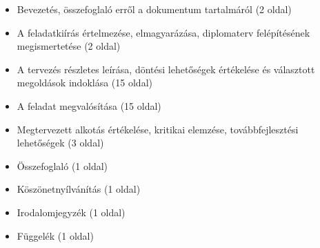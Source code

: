 \begin{itemize}
    \item Bevezetés, összefoglaló erről a dokumentum tartalmáról (2 oldal)
    \item A feladatkiírás értelmezése, elmagyarázása, diplomaterv felépítésének megismertetése (2 oldal)
    \item A tervezés részletes leírása, döntési lehetőségek értékelése és választott megoldások indoklása (15 oldal)
    \item A feladat megvalósítása (15 oldal)
    \item Megtervezett alkotás értékelése, kritikai elemzése, továbbfejlesztési lehetőségek (3 oldal)
    \item Összefoglaló (1 oldal)
    \item Köszönetnyílvánítás (1 oldal)
    \item Irodalomjegyzék (1 oldal)
    \item Függelék (1 oldal)
\end{itemize}